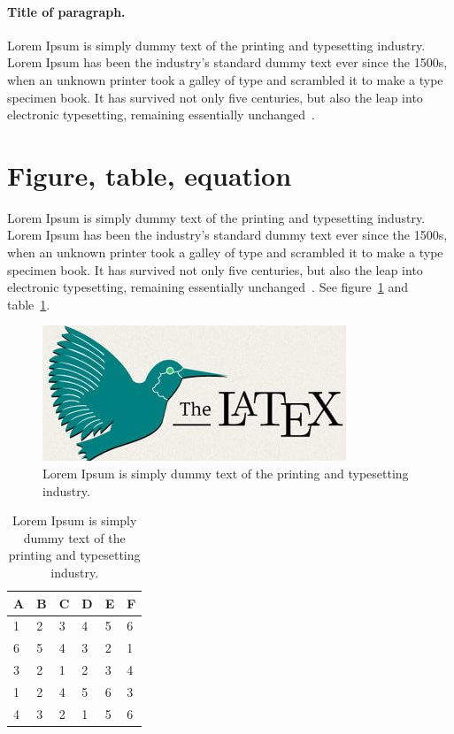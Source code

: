 \documentclass[10pt, a4paper]{article}
\begin{document}
\paragraph{Title of paragraph.}
Lorem Ipsum is simply dummy text of the printing and typesetting industry. Lorem Ipsum has been the industry's standard dummy text ever since the 1500s, when an unknown printer took a galley of type and scrambled it to make a type specimen book. It has survived not only five centuries, but also the leap into electronic typesetting, remaining essentially unchanged~\citep{Magnetism}.

\section{Figure, table, equation}
Lorem Ipsum is simply dummy text of the printing and typesetting industry. Lorem Ipsum has been the industry's standard dummy text ever since the 1500s, when an unknown printer took a galley of type and scrambled it to make a type specimen book. It has survived not only five centuries, but also the leap into electronic typesetting, remaining essentially unchanged~\citep{Magnetism}. See figure~\ref{tab: table-1} and table~\ref{fig:logo}.

\begin{figure}[tbp]
	\centering
	\includegraphics[width=0.35\linewidth]{latex}
	\caption{Lorem Ipsum is simply dummy text of the printing and typesetting industry.}
	\label{fig:logo}
\end{figure}

\begin{table}[tbp]
	\centering
	\caption{Lorem Ipsum is simply dummy text of the printing and typesetting industry.}
	\label{tab: table-1}
  \begin{tabular}{p{1cm}p{1cm}p{1cm}p{1cm}p{1cm}p{1cm}}
	\hline
	A & B &  C &  D & E & F \\
	\hline
	1 & 2 & 3 & 4 & 5 & 6 \\
	6 & 5 & 4 & 3 & 2 & 1 \\
	3 & 2 & 1 & 2 & 3 & 4 \\
	1 & 2 & 4 & 5 & 6 & 3 \\
	4 & 3 & 2 & 1 & 5 & 6 \\
	\hline
\end{tabular}
\end{table}
\end{document}
